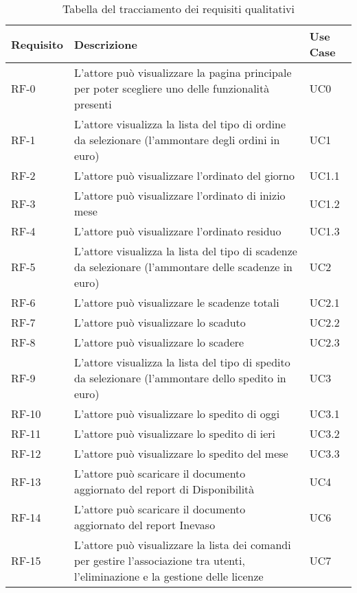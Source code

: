 \begin{table}
\caption{Tabella del tracciamento dei requisiti qualitativi}
\label{tab:requisiti-qualitativi}


\begin{tabular}{ |p{2cm}|p{8cm}|p{2cm}| }

 \hline
\textbf{ Requisito}   &  \textbf{Descrizione}    &  \textbf{    Use Case} \\ 

 \hline
  RF-0 &   L’attore può visualizzare la pagina principale per poter scegliere uno delle funzionalità presenti   & UC0 \\
 \hline
RF-1 &   L’attore visualizza la lista del tipo di ordine da selezionare (l’ammontare degli ordini in euro)  & UC1 \\
 \hline
 RF-2 & L’attore può visualizzare l’ordinato del giorno & UC1.1 \\
\hline
RF-3 & L’attore può visualizzare l’ordinato di inizio mese & UC1.2 \\
\hline
RF-4  &  L’attore può visualizzare l’ordinato residuo  & UC1.3 \\
\hline  
RF-5  & L’attore visualizza la lista del tipo di scadenze da selezionare  (l’ammontare delle scadenze in euro)  & UC2 \\
\hline
RF-6   & L’attore può visualizzare le scadenze totali   & UC2.1 \\
\hline
RF-7  &  L’attore può visualizzare lo scaduto & UC2.2 \\
\hline
RF-8   &  L’attore può visualizzare lo scadere & UC2.3 \\
\hline
RF-9   &  L’attore visualizza la lista del tipo di spedito da selezionare  (l’ammontare dello spedito in euro) & UC3 \\
 \hline
 RF-10   &  L’attore può visualizzare lo spedito di oggi & UC3.1 \\
  \hline
  RF-11   &  L’attore può visualizzare lo spedito di ieri & UC3.2 \\
   \hline
   RF-12  & L’attore può visualizzare lo spedito del mese  & UC3.3 \\
   \hline
   RF-13  &  L’attore può scaricare il documento aggiornato del report di Disponibilità & UC4 \\
   \hline
   RF-14  & L’attore può scaricare il documento aggiornato del report Inevaso   & UC6 \\
   \hline
RF-15    &  L’attore può visualizzare la lista dei comandi per gestire l’associazione tra utenti, l’eliminazione e la gestione delle licenze & UC7 \\

\end{tabular}
\end{table}
